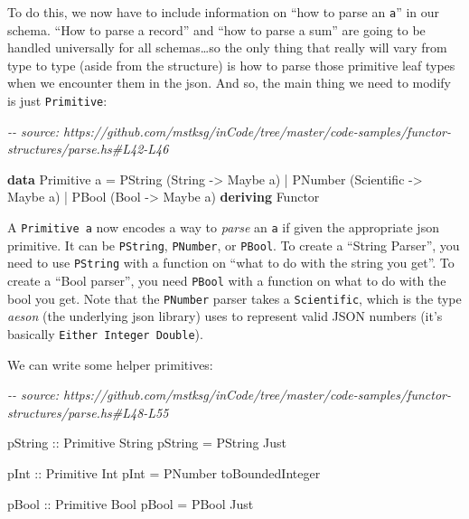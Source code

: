 \documentclass[]{article}
\newenvironment{Shaded}{}{}
\newcommand{\CommentTok}[1]{\textcolor[rgb]{0.38,0.63,0.69}{\textit{#1}}}
\newcommand{\DataTypeTok}[1]{\textcolor[rgb]{0.56,0.13,0.00}{#1}}
\newcommand{\KeywordTok}[1]{\textcolor[rgb]{0.00,0.44,0.13}{\textbf{#1}}}
\newcommand{\NormalTok}[1]{#1}
\newcommand{\OperatorTok}[1]{\textcolor[rgb]{0.40,0.40,0.40}{#1}}
\newcommand{\OtherTok}[1]{\textcolor[rgb]{0.00,0.44,0.13}{#1}}
\begin{document}
To do this, we now have to include information on ``how to parse an \texttt{a}''
in our schema. ``How to parse a record'' and ``how to parse a sum'' are going to
be handled universally for all schemas\ldots so the only thing that really will
vary from type to type (aside from the structure) is how to parse those
primitive leaf types when we encounter them in the json. And so, the main thing
we need to modify is just \texttt{Primitive}:

\begin{Shaded}
\begin{Highlighting}[]
\CommentTok{{-}{-} source: https://github.com/mstksg/inCode/tree/master/code{-}samples/functor{-}structures/parse.hs\#L42{-}L46}

\KeywordTok{data} \DataTypeTok{Primitive}\NormalTok{ a }\OtherTok{=}
      \DataTypeTok{PString}\NormalTok{ (}\DataTypeTok{String} \OtherTok{{-}>} \DataTypeTok{Maybe}\NormalTok{ a)}
    \OperatorTok{|} \DataTypeTok{PNumber}\NormalTok{ (}\DataTypeTok{Scientific} \OtherTok{{-}>} \DataTypeTok{Maybe}\NormalTok{ a)}
    \OperatorTok{|} \DataTypeTok{PBool}\NormalTok{   (}\DataTypeTok{Bool} \OtherTok{{-}>} \DataTypeTok{Maybe}\NormalTok{ a)}
  \KeywordTok{deriving} \DataTypeTok{Functor}
\end{Highlighting}
\end{Shaded}

A \texttt{Primitive\ a} now encodes a way to \emph{parse} an \texttt{a} if given
the appropriate json primitive. It can be \texttt{PString}, \texttt{PNumber}, or
\texttt{PBool}. To create a ``String Parser'', you need to use \texttt{PString}
with a function on ``what to do with the string you get''. To create a ``Bool
parser'', you need \texttt{PBool} with a function on what to do with the bool
you get. Note that the \texttt{PNumber} parser takes a \texttt{Scientific},
which is the type \emph{aeson} (the underlying json library) uses to represent
valid JSON numbers (it's basically \texttt{Either\ Integer\ Double}).

We can write some helper primitives:

\begin{Shaded}
\begin{Highlighting}[]
\CommentTok{{-}{-} source: https://github.com/mstksg/inCode/tree/master/code{-}samples/functor{-}structures/parse.hs\#L48{-}L55}

\OtherTok{pString ::} \DataTypeTok{Primitive} \DataTypeTok{String}
\NormalTok{pString }\OtherTok{=} \DataTypeTok{PString} \DataTypeTok{Just}

\OtherTok{pInt ::} \DataTypeTok{Primitive} \DataTypeTok{Int}
\NormalTok{pInt }\OtherTok{=} \DataTypeTok{PNumber}\NormalTok{ toBoundedInteger}

\OtherTok{pBool ::} \DataTypeTok{Primitive} \DataTypeTok{Bool}
\NormalTok{pBool }\OtherTok{=} \DataTypeTok{PBool} \DataTypeTok{Just}
\end{Highlighting}
\end{Shaded}
\end{document}
